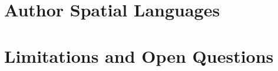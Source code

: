 \documentclass[logo,msc]{infthesis}
\begin{document}
\section{Author Spatial Languages}
%

\section{Limitations and Open Questions}
%
%
%
%
%
%
%
\end{document}
